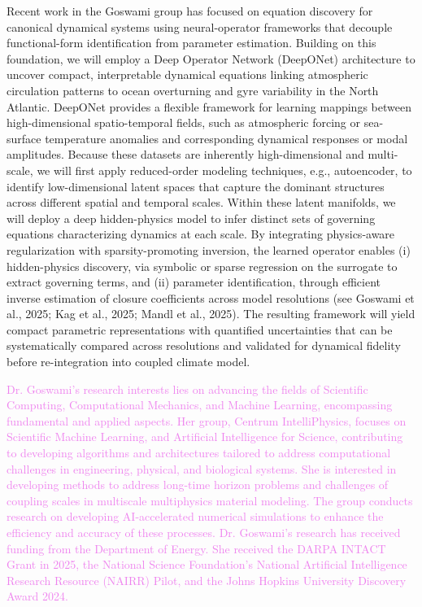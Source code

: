 \documentclass{article}
\begin{document}
Recent work in the Goswami group has focused on equation discovery for canonical dynamical systems using neural-operator frameworks that decouple functional-form identification from parameter estimation. Building on this foundation, we will employ a Deep Operator Network (DeepONet) architecture to uncover compact, interpretable dynamical equations linking atmospheric circulation patterns to ocean overturning and gyre variability in the North Atlantic. DeepONet provides a flexible framework for learning mappings between high-dimensional spatio-temporal fields, such as atmospheric forcing or sea-surface temperature anomalies and corresponding dynamical responses or modal amplitudes. Because these datasets are inherently high-dimensional and multi-scale, we will first apply reduced-order modeling techniques, e.g., autoencoder, to identify low-dimensional latent spaces that capture the dominant structures across different spatial and temporal scales. Within these latent manifolds, we will deploy a deep hidden-physics model to infer distinct sets of governing equations characterizing dynamics at each scale. By integrating physics-aware regularization with sparsity-promoting inversion, the learned operator enables (i) hidden-physics discovery, via symbolic or sparse regression on the surrogate to extract governing terms, and (ii) parameter identification, through efficient inverse estimation of closure coefficients across model resolutions (see Goswami et al., 2025; Kag et al., 2025; Mandl et al., 2025). The resulting framework will yield compact parametric representations with quantified uncertainties that can be systematically compared across resolutions and validated for dynamical fidelity before re-integration into coupled climate model. 

\textcolor{violet}{Dr. Goswami's research interests lies on advancing the fields of Scientific Computing, Computational Mechanics, and Machine Learning, encompassing fundamental and applied aspects. Her  group, Centrum IntelliPhysics, focuses on Scientific Machine Learning, and Artificial Intelligence for Science, contributing to developing algorithms and architectures tailored to address computational challenges in engineering, physical, and biological systems. She is interested in developing methods to address long-time horizon problems and challenges of coupling scales in multiscale multiphysics material modeling. The group conducts research on developing AI-accelerated numerical simulations to enhance the efficiency and accuracy of these processes. Dr. Goswami’s research has received funding from the Department of Energy. She received the DARPA INTACT Grant in 2025, the National Science Foundation’s National Artificial Intelligence Research Resource (NAIRR) Pilot, and the Johns Hopkins University Discovery Award 2024.} 
\end{document}
